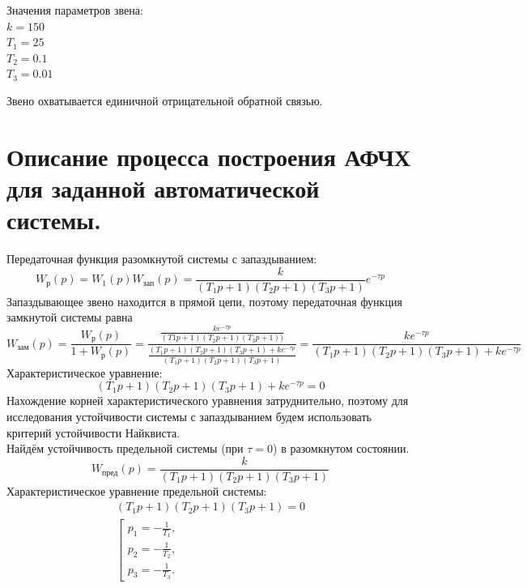 \documentclass[12pt]{article}
\begin{document}
Значения параметров звена: \\
$k = 150$\\
$T_1 =25$\\
$T_2 = 0.1$ \\
$T_3 = 0.01$

Звено охватывается единичной отрицательной обратной связью. \\ 

\section{Описание процесса построения АФЧХ для заданной автоматической
системы.}
Передаточная функция разомкнутой системы с запаздыванием:
\begin{equation}
    W_{р}(p) = W_1(p)W_{зап}(p) = \frac{k}{(T_1p + 1)(T_2p + 1)(T_3p + 1)}e^{-\tau p} 
\end{equation}
Запаздывающее звено находится в прямой цепи, поэтому передаточная функция замкнутой системы равна 
\begin{equation}
    W_{зам}(p) = \frac{W_{р}(p)}{1 + W_{р}(p)} = \frac{\frac{ke^{-\tau p}}{(T1p + 1)(T_2p + 1)(T_3p + 1))}}{\frac{(T_1p + 1)(T_2p + 1)(T_3p + 1) + ke^{-\tau p}}{(T_1p + 1)(T_2p + 1)(T_3p + 1)}} = \frac{ke^{-\tau p}}{(T_1p + 1)(T_2p + 1)(T_3p + 1) + ke^{-\tau p}}
\end{equation}
Характеристическое уравнение:
\begin{equation}
    (T_1p + 1)(T_2p + 1)(T_3p + 1) + ke^{-\tau p} = 0
\end{equation}
Нахождение корней характеристического уравнения затруднительно, поэтому для исследования устойчивости системы с запаздыванием будем использовать критерий устойчивости Найквиста. \\
Найдём устойчивость предельной системы (при $\tau = 0$) в разомкнутом состоянии.
\begin{equation}
    W_{пред}(p) = \frac{k}{(T_1p + 1)(T_2p + 1)(T_3p + 1)}
\end{equation}
Характеристическое уравнение предельной системы:
\begin{equation}
\begin{gathered}
    (T_1p + 1)(T_2p + 1)(T_3p + 1) = 0 \\
    \left[
       \begin{gathered}
        p_1 = -\frac{1}{T_1}, \\
        p_2 = -\frac{1}{T_2}, \\
        p_3 = -\frac{1}{T_3}.
     \end{gathered}
     \right.
\end{gathered}
\end{equation}
\end{document}
